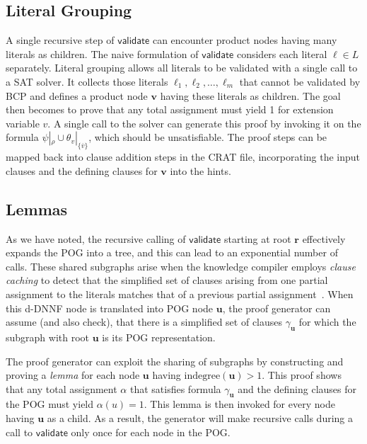 \documentclass[letterpaper,USenglish,cleveref, autoref, thm-restate]{lipics-v2021}
\newcommand{\obar}[1]{\overline{#1}}
\newcommand{\lit}{\ell}
\newcommand{\assign}{\alpha}
\newcommand{\passign}{\rho}
\newcommand{\indegree}{\textrm{indegree}}
\newcommand{\validate}{\textsf{validate}}
\newcommand{\makenode}[1]{\mathbf{#1}}
\newcommand{\nodeu}{\makenode{u}}
\newcommand{\nodev}{\makenode{v}}
\newcommand{\noder}{\makenode{r}}
\newcommand{\simplify}[2]{#1|_{#2}}
\begin{document}
\label{app:optimizations}

\subsection{Literal Grouping}

A single recursive step of $\validate$ can encounter product nodes
having many literals as children.  The naive formulation of $\validate$
considers each literal $\lit \in L$ separately.
Literal grouping allows all literals to be validated with a single call to a SAT solver.
It collects those literals
$\lit_1, \lit_2, \ldots, \lit_m$ that cannot be validated by BCP and defines a
product node $\nodev$ having these literals as children.  The goal
then becomes to prove that any total assignment must yield 1 for extension
variable $v$.  A single call to the solver can generate this proof by invoking it on the formula
  $\simplify{\psi}{\passign} \cup \simplify{\theta_{v}}{\{ \obar{v} \}}$, which should be unsatisfiable.
  The proof steps can be mapped back into clause addition steps in the CRAT file, incorporating the 
  input clauses and the defining clauses for $\nodev$ into the hints.


\subsection{Lemmas}
\label{app:lemma}

As we have noted, the recursive calling of $\validate$ starting at
root $\noder$ effectively expands the POG into a tree, and this can
lead to an exponential number of calls.
These shared subgraphs arise when the knowledge compiler employs {\em clause caching}
to detect that the simplified set of
clauses arising from one partial assignment to the literals matches that
of a previous partial assignment~\cite{darwiche:aaai:2002}.
When this d-DNNF node is translated into POG
node $\nodeu$, the proof generator can assume (and also check), that
there is a simplified set of clauses $\gamma_{\nodeu}$
for which the subgraph with root $\nodeu$ is its POG representation.

The proof generator can exploit the sharing of subgraphs
by constructing and proving a {\em lemma} for each node
$\nodeu$ having $\indegree(\nodeu) > 1$.  This proof shows that any
total assignment $\assign$ that satisfies formula $\gamma_{\nodeu}$ and the defining clauses for the POG must yield
$\assign(u) = 1$.  This lemma is then invoked for every node having
$\nodeu$ as a child.
As a result, the generator will make recursive calls during a call to $\validate$ only once for each node in the POG\@.
\end{document}
